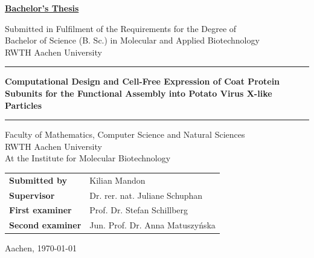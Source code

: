\documentclass[12pt]{article}
\begin{document}
\begin{titlepage}
    \begin{center}
         \vspace*{0.5cm}
         
         \textbf{\underline{Bachelor's Thesis}}
         
         \vspace{1.5cm}
         
         \large
         Submitted in Fulfilment of the Requirements for the Degree of\\
         Bachelor of Science (B. Sc.) in Molecular and Applied Biotechnology\\
         RWTH Aachen University
         
         \vspace{1cm}
         
         \rule{\textwidth}{0.4pt}
         
         \vspace{1cm}
         
         \textbf{\LARGE Computational Design and Cell-Free Expression of
         Coat Protein Subunits for the Functional Assembly into
         Potato Virus X-like Particles}
         
         \vspace{1cm}
         
         \rule{\textwidth}{0.4pt}
         
         \vspace{1cm}
         
         Faculty of Mathematics, Computer Science and Natural Sciences\\
         RWTH Aachen University\\
         
         At the Institute for Molecular Biotechnology
         
         \vspace{1cm}
         
         \begin{tabular}{ll}
         \textbf{Submitted by} & Kilian Mandon \\
         \textbf{Supervisor} & Dr. rer. nat. Juliane Schuphan \\
         \textbf{First examiner} & Prof. Dr. Stefan Schillberg \\
         \textbf{Second examiner} & Jun. Prof. Dr. Anna Matuszyńska \\
         \end{tabular}
         
         \vspace{1cm}
         
         Aachen, \today
         
    \end{center}
 \end{titlepage}
\end{document}
